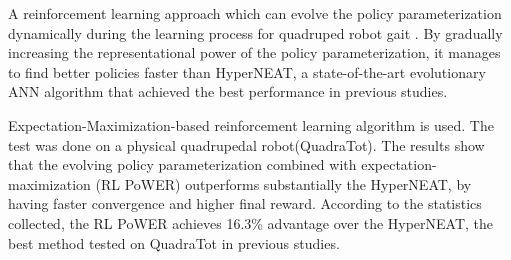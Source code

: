 A reinforcement learning approach which can evolve the policy parameterization dynamically during
the learning process for quadruped robot gait . By gradually increasing the representational
power of the policy parameterization, it manages to find better
policies faster than HyperNEAT, a state-of-the-art evolutionary ANN algorithm that achieved the best performance in previous studies.

Expectation-Maximization-based reinforcement learning algorithm
is used. The test was done on a physical quadrupedal robot(QuadraTot). The results show that the evolving policy parameterization combined with expectation-maximization (RL PoWER)
outperforms substantially the HyperNEAT, by having
faster convergence and higher final
reward. According to the statistics collected, the RL PoWER achieves 16.3\%
advantage over the HyperNEAT, the best method tested on QuadraTot in previous studies.
